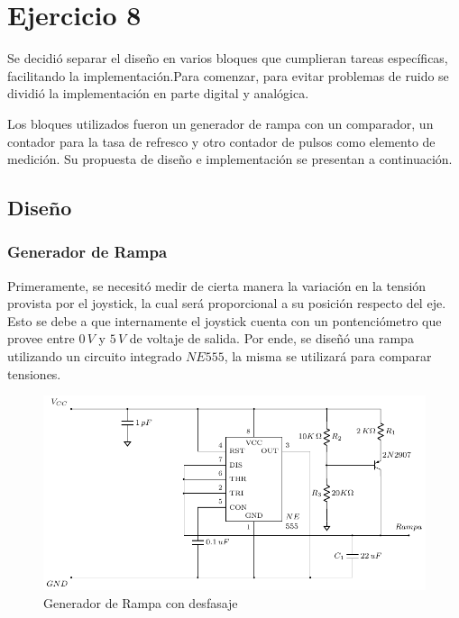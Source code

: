 \section{Ejercicio 8}
Se decidió separar el diseño en varios bloques que cumplieran tareas específicas, facilitando la implementación.Para comenzar, para evitar problemas de ruido se dividió la implementación en parte digital y analógica.\par
 Los bloques utilizados fueron un generador de rampa con un comparador, un contador para la tasa de refresco y otro contador de pulsos como elemento de medición. Su propuesta de diseño e implementación se presentan a continuación. \par

\subsection{Diseño}

\subsubsection{Generador de Rampa}

Primeramente, se necesitó medir de cierta manera la variación en la tensión provista por el joystick, la cual será proporcional a su posición respecto del eje. Esto se debe a que internamente el joystick cuenta con un pontenciómetro que provee entre $0\,V$ y $5\,V$ de voltaje de salida. Por ende, se diseñó una rampa utilizando un circuito integrado $NE555$, la misma se utilizará para comparar tensiones. \par

\begin{figure}[H]
\centering
\includegraphics[scale=0.8]{Ejercicio8/Circuitos/Generador_de_rampa.pdf}
\caption{Generador de Rampa con desfasaje}
\label{fig:Generador_de_rampa}
\end{figure}

